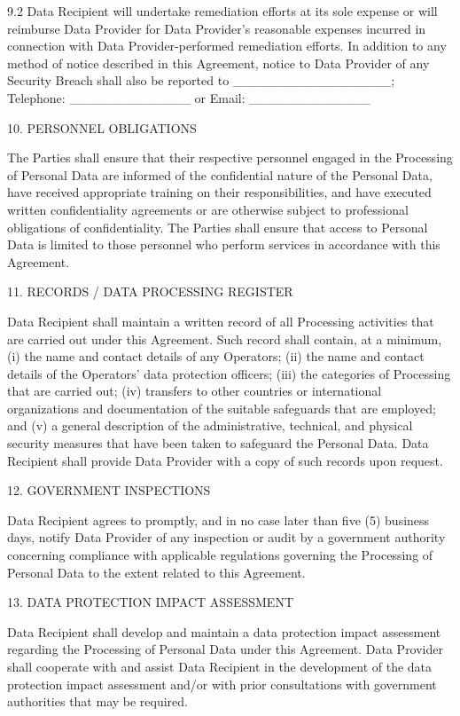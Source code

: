 \documentclass[12pt,letterpaper]{article}
\begin{document}
9.2	Data Recipient will undertake remediation efforts at its sole expense or will reimburse Data Provider for Data Provider’s reasonable expenses incurred in connection with Data Provider-performed remediation efforts.  In addition to any method of notice described in this Agreement, notice to Data Provider of any Security Breach shall also be reported to \_\_\_\_\_\_\_\_\_\_\_\_\_\_\_\_\_; Telephone:  \_\_\_\_\_\_\_\_\_\_\_\_\_ or Email: \_\_\_\_\_\_\_\_\_\_\_\_\_  

10.	PERSONNEL OBLIGATIONS	

The Parties shall ensure that their respective personnel engaged in the Processing of Personal Data are informed of the confidential nature of the Personal Data, have received appropriate training on their responsibilities, and have executed written confidentiality agreements or are otherwise subject to professional obligations of confidentiality.  The Parties shall ensure that access to Personal Data is limited to those personnel who perform services in accordance with this Agreement.

11.	RECORDS / DATA PROCESSING REGISTER

Data Recipient shall maintain a written record of all Processing activities that are carried out under this Agreement.  Such record shall contain, at a minimum, (i) the name and contact details of any Operators; (ii) the name and contact details of the Operators’ data protection officers; (iii) the categories of Processing that are carried out; (iv) transfers to other countries or international organizations and documentation of the suitable safeguards that are employed; and (v) a general description of the administrative, technical, and physical security measures that have been taken to safeguard the Personal Data.  Data Recipient shall provide Data Provider with a copy of such records upon request.

12.	GOVERNMENT INSPECTIONS

Data Recipient agrees to promptly, and in no case later than five (5) business days, notify Data Provider of any inspection or audit by a government authority concerning compliance with applicable regulations governing the Processing of Personal Data to the extent related to this Agreement.

13.	DATA PROTECTION IMPACT ASSESSMENT		

Data Recipient shall develop and maintain a data protection impact assessment regarding the Processing of Personal Data under this Agreement.  Data Provider shall cooperate with and assist Data Recipient in the development of the data protection impact assessment and/or with prior consultations with government authorities that may be required.
\end{document}

